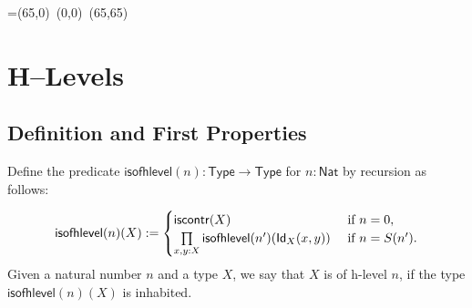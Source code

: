 


\newbox\pbbox
\setbox\pbbox=\hbox{\xy \POS(65,0)\ar@{-} (0,0) \ar@{-} (65,65)\endxy}
\def\pb{\save[]+<3.5mm,-3.5mm>*{\copy\pbbox} \restore}


\newcommand{\comp}[2]{\ensuremath{{#2} \circ {#1}}}

%
\newcommand{\contr}{\ensuremath{\mathsf{contr}}}
\newcommand{\iscontr}{\ensuremath{\mathsf{iscontr}}}
 \newcommand{\HLevel}{\mathsf{HLevel}}
 \newcommand{\hProp}{\mathsf{hProp}}
 \newcommand{\ishProp}{\mathsf{ishProp}}
 \newcommand{\isofhlevel}{\mathsf{isofhlevel}}
 \newcommand{\isweq}{\mathsf{isweq}}
 \newcommand{\Nat}{\mathsf{Nat}}
 \newcommand{\Type}{\mathsf{Type}}






\chapter{H--Levels}

\section{Definition and First Properties}

\begin{defn}\label{def:hlevel}
  Define the predicate $\isofhlevel(n) : \Type \to \Type$ for $n : \Nat$ by recursion as follows:
  
\[ \isofhlevel(n)(X) := \begin{cases}
                         \iscontr(X) & \text{ if } n = 0 , \\
                         \prod\limits_{x,y : X}\isofhlevel(n')(\idtype[X]{x}{y}) & \text{ if } n = S(n') .
                        \end{cases}
\]
%   
Given a natural number $n$ and a type $X$, we say that $X$ is of h-level $n$, if the type $\isofhlevel(n)(X)$ is inhabited.
\end{defn}

